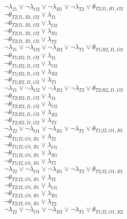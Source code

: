 $\neg\lambda_{I1} \vee \neg\lambda_{O2} \vee \neg\lambda_{R1} \vee \neg\lambda_{T2} \vee \theta_{T2|I1,R1,O2}$\\
$\neg\theta_{T2|I1,R1,O2} \vee \lambda_{I1}$\\
$\neg\theta_{T2|I1,R1,O2} \vee \lambda_{O2}$\\
$\neg\theta_{T2|I1,R1,O2} \vee \lambda_{R1}$\\
$\neg\theta_{T2|I1,R1,O2} \vee \lambda_{T2}$\\
$\neg\lambda_{I1} \vee \neg\lambda_{O2} \vee \neg\lambda_{R2} \vee \neg\lambda_{T1} \vee \theta_{T1|R2,I1,O2}$\\
$\neg\theta_{T1|R2,I1,O2} \vee \lambda_{I1}$\\
$\neg\theta_{T1|R2,I1,O2} \vee \lambda_{O2}$\\
$\neg\theta_{T1|R2,I1,O2} \vee \lambda_{R2}$\\
$\neg\theta_{T1|R2,I1,O2} \vee \lambda_{T1}$\\
$\neg\lambda_{I1} \vee \neg\lambda_{O2} \vee \neg\lambda_{R2} \vee \neg\lambda_{T2} \vee \theta_{T2|R2,I1,O2}$\\
$\neg\theta_{T2|R2,I1,O2} \vee \lambda_{I1}$\\
$\neg\theta_{T2|R2,I1,O2} \vee \lambda_{O2}$\\
$\neg\theta_{T2|R2,I1,O2} \vee \lambda_{R2}$\\
$\neg\theta_{T2|R2,I1,O2} \vee \lambda_{T2}$\\
$\neg\lambda_{I2} \vee \neg\lambda_{O1} \vee \neg\lambda_{R1} \vee \neg\lambda_{T1} \vee \theta_{T1|I2,O1,R1}$\\
$\neg\theta_{T1|I2,O1,R1} \vee \lambda_{I2}$\\
$\neg\theta_{T1|I2,O1,R1} \vee \lambda_{O1}$\\
$\neg\theta_{T1|I2,O1,R1} \vee \lambda_{R1}$\\
$\neg\theta_{T1|I2,O1,R1} \vee \lambda_{T1}$\\
$\neg\lambda_{I2} \vee \neg\lambda_{O1} \vee \neg\lambda_{R1} \vee \neg\lambda_{T2} \vee \theta_{T2|I2,O1,R1}$\\
$\neg\theta_{T2|I2,O1,R1} \vee \lambda_{I2}$\\
$\neg\theta_{T2|I2,O1,R1} \vee \lambda_{O1}$\\
$\neg\theta_{T2|I2,O1,R1} \vee \lambda_{R1}$\\
$\neg\theta_{T2|I2,O1,R1} \vee \lambda_{T2}$\\
$\neg\lambda_{I2} \vee \neg\lambda_{O1} \vee \neg\lambda_{R2} \vee \neg\lambda_{T1} \vee \theta_{T1|I2,O1,R2}$\\
